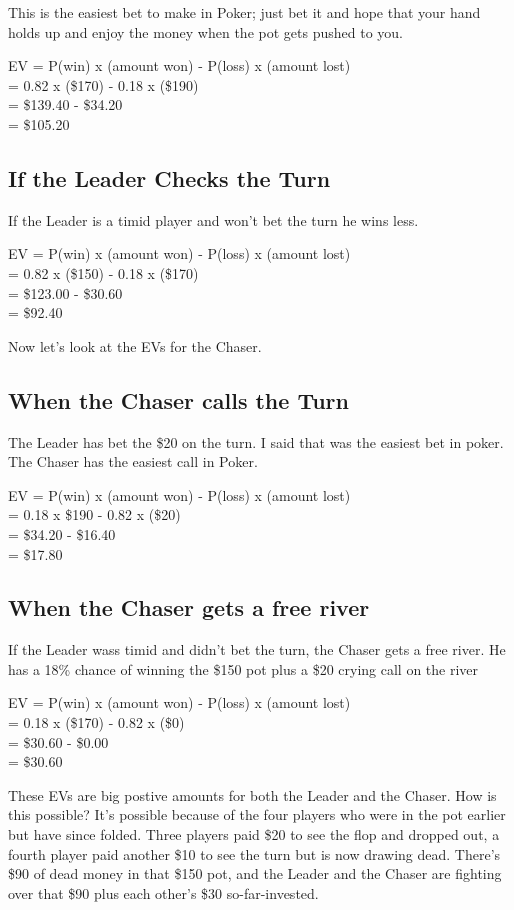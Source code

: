 This is the easiest bet to make in Poker; just bet it and hope that
your hand holds up and enjoy the money when the pot gets pushed to
you.

EV = P(win) x (amount won) - P(loss) x (amount lost) \\
   = 0.82   x (\$170)      - 0.18    x (\$190) \\
   = \$139.40 - \$34.20 \\
   = \$105.20

\subsection{If the Leader Checks the Turn}

If the Leader is a timid player and won't bet the turn
he wins less.

EV = P(win) x (amount won) - P(loss) x (amount lost) \\
   = 0.82   x (\$150)      - 0.18    x (\$170) \\
   = \$123.00 - \$30.60 \\
   = \$92.40

Now let's look at the EVs for the Chaser.

\subsection{When the Chaser calls the Turn}

The Leader has bet the \$20 on the turn. I said that was the easiest
bet in poker. The Chaser has the easiest call in Poker.

EV = P(win) x (amount won) - P(loss) x (amount lost) \\
   = 0.18 x \$190 - 0.82 x (\$20) \\
   = \$34.20 - \$16.40 \\
   = \$17.80

\subsection{When the Chaser gets a free river}

If the Leader wass timid and didn't bet the turn, the Chaser gets a
free river. He has a 18\% chance of winning the \$150 pot plus a \$20
crying call on the river

EV = P(win) x (amount won) - P(loss) x (amount lost) \\
   = 0.18 x (\$170) - 0.82 x (\$0) \\
   = \$30.60 - \$0.00 \\
   = \$30.60


These EVs are big postive amounts for both the Leader and the
Chaser. How is this possible? It's possible because of the four
players who were in the pot earlier but have since folded. Three
players paid \$20 to see the flop and dropped out, a fourth player
paid another \$10 to see the turn but is now drawing dead. There's
\$90 of dead money in that \$150 pot, and the Leader and the Chaser
are fighting over that \$90 plus each other's \$30 so-far-invested.

